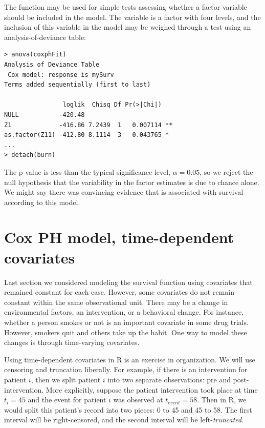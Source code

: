 \documentclass[article]{jss}
\begin{document}
The  function may be used for simple tests assessing whether a factor variable should be included in the model. The  variable is a factor with four levels, and the inclusion of this variable in the model may be weighed through a test using an analysis-of-deviance table:
\begin{verbatim}
> anova(coxphFit)
Analysis of Deviance Table
 Cox model: response is mySurv
Terms added sequentially (first to last)

                loglik  Chisq Df Pr(>|Chi|)   
NULL           -420.48                        
Z1             -416.86 7.2439  1   0.007114 **
as.factor(Z11) -412.80 8.1114  3   0.043765 * 
...
> detach(burn)
\end{verbatim}
The p-value is less than the typical significance level, $\alpha=0.05$, so we reject the null hypothesis that the variability in the factor estimates is due to chance alone. We might say there was convincing evidence  that  is associated with survival according to this model.

\pagebreak

\section[Cox PH model, time-dependent covariates]{Cox PH model, time-dependent covariates}
\label{coxPHTimeDepCov}

Last section we considered modeling the survival function using covariates that remained constant for each case. However, some covariates do not remain constant within the same observational unit. There may be a change in environmental factors, an intervention, or a behavioral change. For instance, whether a person smokes or not is an important covariate in some drug trials. However, smokers quit and others take up the habit. One way to model these changes is through time-varying covariates.

Using time-dependent covariates in R is an exercise in organization. We will use censoring and truncation liberally. For example, if there is an intervention for patient $i$, then we split patient $i$ into two separate observations: pre and post-intervention. More explicitly, suppose the patient intervention took place at time $t_{i} = 45$ and the event for patient $i$ was observed at $t_{event}=58$. Then in R, we would split this patient's record into two pieces: 0 to 45 and 45 to 58. The first interval will be right-censored, and the second interval will be left-\emph{truncated}.
\end{document}
